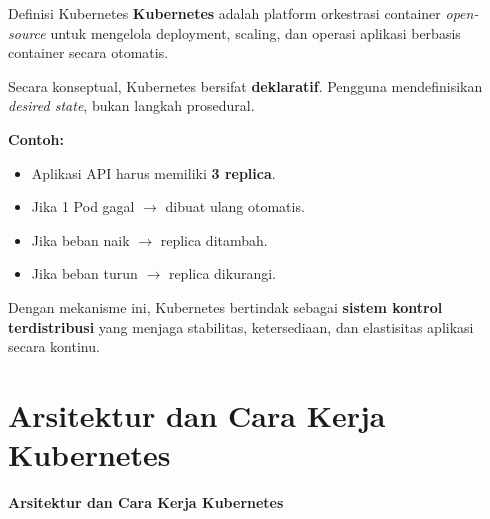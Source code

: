 \documentclass[aspectratio=169, table]{beamer}
\begin{document}
\begin{frame}{Definisi Kubernetes}
\vspace{20pt}
\textbf{Kubernetes} adalah platform orkestrasi container \textit{open-source} 
untuk mengelola deployment, scaling, dan operasi aplikasi berbasis container secara otomatis.

\vspace{6pt}
Secara konseptual, Kubernetes bersifat \textbf{deklaratif}. 
Pengguna mendefinisikan \textit{desired state}, bukan langkah prosedural.

\vspace{6pt}
\textbf{Contoh:}
\begin{itemize}
    \item Aplikasi API harus memiliki \textbf{3 replica}.
    \item Jika 1 Pod gagal $\rightarrow$ dibuat ulang otomatis.
    \item Jika beban naik $\rightarrow$ replica ditambah.
    \item Jika beban turun $\rightarrow$ replica dikurangi.
\end{itemize}

\vspace{6pt}
Dengan mekanisme ini, Kubernetes bertindak sebagai 
\textbf{sistem kontrol terdistribusi} yang menjaga stabilitas, 
ketersediaan, dan elastisitas aplikasi secara kontinu.
\end{frame}


\section{Arsitektur dan Cara Kerja Kubernetes}
\begin{frame}{\hfill}
	\centering
	\Huge{\textbf{Arsitektur dan Cara Kerja Kubernetes}}
\end{frame}
\end{document}
